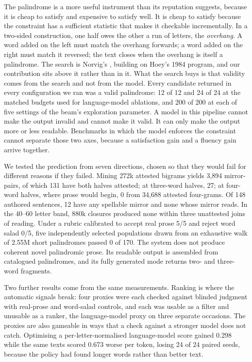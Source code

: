 \documentclass[11pt]{article}
\begin{document}
The palindrome is a more useful instrument than its reputation suggests,
because it is cheap to satisfy and expensive to satisfy well. It is cheap to
satisfy because the constraint has a sufficient statistic that makes it
checkable incrementally. In a two-sided construction, one half owes the other a
run of letters, the \emph{overhang}. A word added on the left must match the
overhang forwards; a word added on the right must match it reversed; the text
closes when the overhang is itself a palindrome. The search is Norvig's
\citeyearpar{norvig2002}, building on Hoey's 1984 program, and our contribution
sits above it rather than in it. What the search buys is that validity comes
from the search and not from the model. Every candidate returned in every
configuration we ran was a valid palindrome: 12 of 12 and 24 of 24 at the
matched budgets used for language-model ablations, and 200 of 200 at each of
five settings of the beam's exploration parameter. A model in this pipeline
cannot make the output invalid and cannot make it valid. It can only make the
output more or less readable. Benchmarks in which the model enforces the
constraint cannot separate those two axes, because a satisfaction gain and a
fluency gain arrive together.

We tested the prediction from seven directions, chosen so that they would fail
for different reasons if they failed. Mining 272k attested bigrams yields 3{,}894
mirror-pairs, of which 131 have both halves attested; at three-word halves, 27;
at four-word halves, where prose would begin, 0 from 34{,}688 attested
four-grams. Of 148 authored sentences, 12 have any spellable mirror and none
whose mirror reads. In the 40--60 letter band, 880k closures produced none
within three unattested joins of reading. Under a rubric calibrated to accept
real prose 5/5 and reject word salad 0/5, five independently selected
populations drawn from an exhaustive walk of 2.55M short palindromes passed 0
of 170. The system does not produce coherent novel palindromic prose. Its
readable output is assembled from catalogued palindromes, and its fully
generated mode returns two- and three-word fragments.

Two further results come from the same measurements. Ranking is where the
automatic signals break: four proxies were each checked against blinded
judgment with real-prose and word-salad controls, and each was usable as a
filter and unusable as a ranker, the language-model proxy on three separate
occasions. The proxies are also gameable in ways that a check against a
stronger model does not catch. Optimising a per-letter-normalised
language-model score gained 0.298 while the same texts scored 0.673 worse per
token, losing 24 of 24 paired seeds, because the policy had found longer words
rather than better text.
\end{document}
